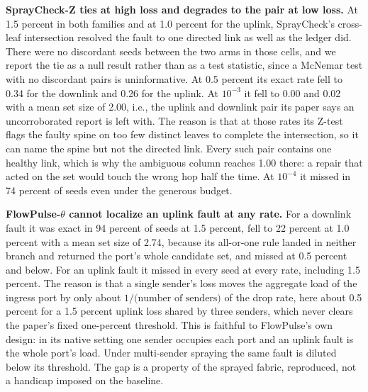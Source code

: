 \textbf{SprayCheck-Z ties at high loss and degrades to the pair at low loss.} At 1.5 percent in both families and at 1.0 percent for the uplink, SprayCheck's cross-leaf intersection resolved the fault to one directed link as well as the ledger did. There were no discordant seeds between the two arms in those cells, and we report the tie as a null result rather than as a test statistic, since a McNemar test with no discordant pairs is uninformative. At 0.5 percent its exact rate fell to 0.34 for the downlink and 0.26 for the uplink. At $10^{-3}$ it fell to 0.00 and 0.02 with a mean set size of 2.00, i.e., the uplink and downlink pair its paper says an uncorroborated report is left with. The reason is that at those rates its Z-test flags the faulty spine on too few distinct leaves to complete the intersection, so it can name the spine but not the directed link. Every such pair contains one healthy link, which is why the ambiguous column reaches 1.00 there: a repair that acted on the set would touch the wrong hop half the time. At $10^{-4}$ it missed in 74 percent of seeds even under the generous budget.

\textbf{FlowPulse-$\theta$ cannot localize an uplink fault at any rate.} For a downlink fault it was exact in 94 percent of seeds at 1.5 percent, fell to 22 percent at 1.0 percent with a mean set size of 2.74, because its all-or-one rule landed in neither branch and returned the port's whole candidate set, and missed at 0.5 percent and below. For an uplink fault it missed in every seed at every rate, including 1.5 percent. The reason is that a single sender's loss moves the aggregate load of the ingress port by only about $1/\!\text{(number of senders)}$ of the drop rate, here about 0.5 percent for a 1.5 percent uplink loss shared by three senders, which never clears the paper's fixed one-percent threshold. This is faithful to FlowPulse's own design: in its native setting one sender occupies each port and an uplink fault is the whole port's load. Under multi-sender spraying the same fault is diluted below its threshold. The gap is a property of the sprayed fabric, reproduced, not a handicap imposed on the baseline.

